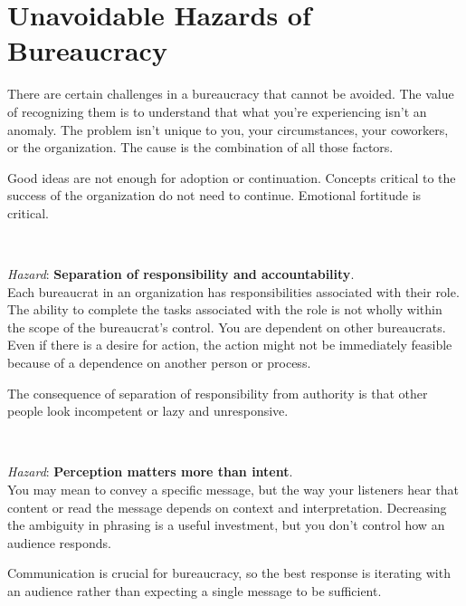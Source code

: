 \section{Unavoidable Hazards of Bureaucracy\label{sec:unavoidable-hazards}}

There are certain challenges in a bureaucracy that cannot be avoided. The value of recognizing them is to understand that what you're experiencing isn't an anomaly. The problem isn't unique to you, your circumstances, your coworkers, or the organization. The cause is the combination of all those factors.

Good ideas are not enough for adoption or continuation.
Concepts critical to the success of the organization do not need to continue. Emotional fortitude is critical.


\ \\
\begin{samepage}
\textit{Hazard}: \textbf{Separation of responsibility and accountability}. \\
Each bureaucrat in an organization has responsibilities associated with their role. The ability to complete the tasks associated with the role is not wholly within the scope of the bureaucrat's control. You are dependent on other bureaucrats. Even if there is a desire for action, the action might not be immediately feasible because of a dependence on another person or process. 

The consequence of separation of responsibility from authority is that other people look incompetent or lazy and unresponsive.
\end{samepage}

\ \\
\begin{samepage}
\textit{Hazard}: \textbf{Perception matters more than intent}. \\
You may mean to convey a specific message, but the way your listeners hear that content or read the message depends on context and interpretation. 
Decreasing the ambiguity in phrasing is a useful investment, but you don't control how an audience responds. 

Communication is crucial for bureaucracy, so the best response is iterating with an audience rather than expecting a single message to be sufficient. 
\end{samepage}


